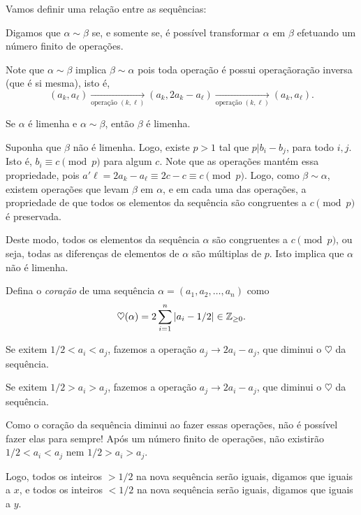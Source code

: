 \documentclass[11pt,a4paper]{article}
\begin{document}
	\newpage
	\begin{sol}
		Vamos definir uma relação entre as sequências:
		\begin{defn}
			Digamos que $\alpha \sim \beta$ se, e somente se, é possível transformar $\alpha$ em $\beta$ efetuando um número finito de operações.
		\end{defn}

		Note que $\alpha \sim \beta$ implica  $\beta \sim \alpha$ pois toda operação é possui operaçãoração inversa (que é si mesma), isto é, \[(a_k, a_\ell) \xrightarrow[\text{operação $(k, \ell)$}]{} (a_k, 2a_k - a_\ell) \xrightarrow[\text{operação $(k, \ell)$}]{} (a_k, a_\ell).\]

		\begin{lem}
			Se $\alpha$ é limenha e $\alpha \sim \beta$, então $\beta$ é limenha.
		\end{lem}
		\begin{dem}
			Suponha que $\beta$ não é limenha. Logo, existe $p > 1$ tal que $p | b_i - b_j$, para todo $i, j$. Isto é, $b_i \equiv c \pmod{p}$ para algum $c$. Note que as operações mantém essa propriedade, pois $a'\ell = 2a_k - a_\ell \equiv 2c - c \equiv c \pmod{p}$. Logo, como $\beta \sim \alpha$, existem operações que levam $\beta$ em $\alpha$, e em cada uma das operações, a propriedade de que todos os elementos da sequência são congruentes a $c \pmod{p}$ é preservada.

			Deste modo, todos os elementos da sequência $\alpha$ são congruentes a $c \pmod{p}$, ou seja, todas as diferenças de elementos de $\alpha$ são múltiplas de $p$. Isto implica que $\alpha$ não é limenha. 
		\end{dem}

		Defina o \emph{coração} de uma sequência $ \alpha = (a_1, a_2, \dots, a_n)$ como \[\heartsuit(\alpha) = 2\sum_{i = 1}^n \left| a_i - 1/2 \right| \in \mathbb{Z}_{\ge 0}. \]

		Se exitem $1/2 < a_i < a_j$, fazemos a operação $a_j \to 2a_i - a_j$, que diminui o $\heartsuit$ da sequência.

		Se exitem $1/2 > a_i > a_j$, fazemos a operação $a_j \to 2a_i - a_j$, que diminui o $\heartsuit$ da sequência.

		Como o coração da sequência diminui ao fazer essas operações, não é possível fazer elas para sempre! Após um número finito de operações, não existirão $1/2 < a_i < a_j$ nem  $1/2 > a_i > a_j$.
		
		Logo, todos os inteiros $ > 1/2$ na nova sequência serão iguais, digamos que iguais a $x$, e todos os inteiros $< 1/2$ na nova sequência serão iguais, digamos que iguais a $y$.  
		

\end{sol}
\end{document}
